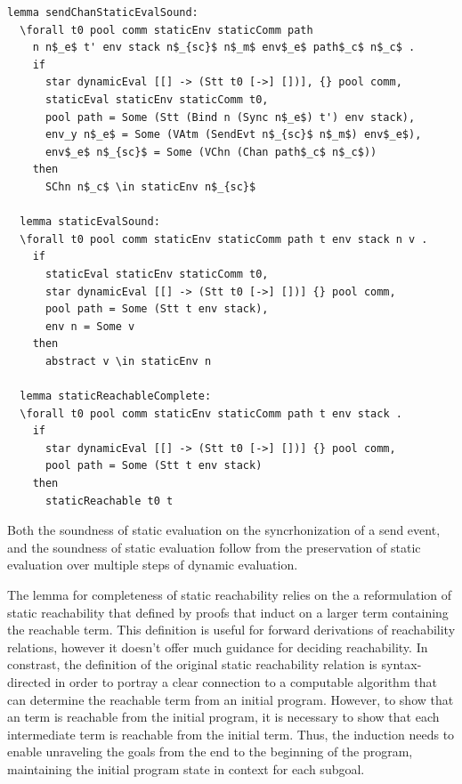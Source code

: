 \documentclass[10pt]{article}
\begin{document}
\begin{lstlisting}[language=logic, mathescape]
  lemma sendChanStaticEvalSound:
  \forall t0 pool comm staticEnv staticComm path
    n n$_e$ t' env stack n$_{sc}$ n$_m$ env$_e$ path$_c$ n$_c$ .
    if
      star dynamicEval [[] -> (Stt t0 [->] [])], {} pool comm,
      staticEval staticEnv staticComm t0,
      pool path = Some (Stt (Bind n (Sync n$_e$) t') env stack),
      env_y n$_e$ = Some (VAtm (SendEvt n$_{sc}$ n$_m$) env$_e$),
      env$_e$ n$_{sc}$ = Some (VChn (Chan path$_c$ n$_c$))
    then
      SChn n$_c$ \in staticEnv n$_{sc}$

  lemma staticEvalSound:
  \forall t0 pool comm staticEnv staticComm path t env stack n v .
    if
      staticEval staticEnv staticComm t0, 
      star dynamicEval [[] -> (Stt t0 [->] [])] {} pool comm,
      pool path = Some (Stt t env stack), 
      env n = Some v
    then
      abstract v \in staticEnv n 

  lemma staticReachableComplete:
  \forall t0 pool comm staticEnv staticComm path t env stack .
    if
      star dynamicEval [[] -> (Stt t0 [->] [])] {} pool comm,
      pool path = Some (Stt t env stack)
    then
      staticReachable t0 t 
\end{lstlisting}

Both the soundness of static evaluation on the syncrhonization of a send event,
and the soundness of static evaluation follow from
the preservation of static evaluation over multiple steps of dynamic evaluation.

The lemma for completeness of static reachability relies on the a reformulation of
static reachability that defined by proofs that induct on a larger term
containing the reachable term.  This definition is useful for forward derivations
of reachability relations, however it doesn't offer much guidance for deciding reachability. 
In constrast, the definition of the original static reachability relation is
syntax-directed in order to portray a clear connection to
a computable algorithm that can determine the reachable term from an initial program.
However, to show that an term is reachable from the initial program, it is necessary to
show that each intermediate term is reachable from the initial term.  Thus, the
induction needs to enable unraveling the goals from the end to the beginning of the program,
maintaining the initial program state in context for each subgoal.
\end{document}
